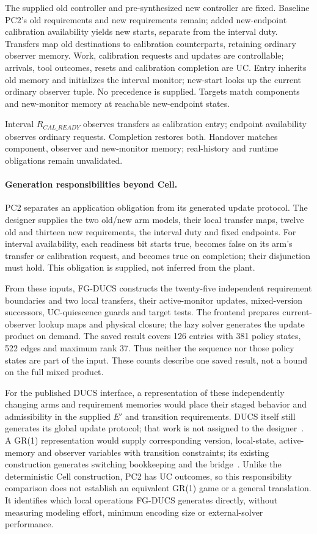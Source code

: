The supplied old controller and pre-synthesized new controller are fixed. Baseline PC2's old requirements and \ContractPCTwoNew{} new requirements remain; added new-endpoint calibration availability yields \PCTwoTraceNewStarts{} new starts, separate from the interval duty. Transfers map old destinations to calibration counterparts, retaining ordinary observer memory. Work, calibration requests and updates are controllable; arrivals, tool outcomes, resets and calibration completion are UC. Entry inherits old memory and initializes the interval monitor; new-start looks up the current ordinary observer tuple. No precedence is supplied. Targets match components and new-monitor memory at reachable new-endpoint states.

Interval $R_{CAL\_READY}$ observes transfers as calibration entry; endpoint availability observes ordinary requests. Completion restores both. Handover matches component, observer and new-monitor memory; real-history and runtime obligations remain unvalidated.


\paragraph{Generation responsibilities beyond Cell.}\label{ta:pc2-generation}
PC2 separates an application obligation from its generated update protocol. The designer supplies the two old/new arm models, their local transfer maps, twelve old and thirteen new requirements, the interval duty and fixed endpoints. For interval availability, each readiness bit starts true, becomes false on its arm's transfer or calibration request, and becomes true on completion; their disjunction must hold. This obligation is supplied, not inferred from the plant.

From these inputs, FG-DUCS constructs the twenty-five independent requirement boundaries and two local transfers, their active-monitor updates, mixed-version successors, UC-quiescence guards and target tests. The frontend prepares current-observer lookup maps and physical closure; the lazy solver generates the update product on demand. The saved result covers 126 entries with 381 policy states, 522 edges and maximum rank 37. Thus neither the sequence nor those policy states are part of the input. These counts describe one saved result, not a bound on the full mixed product.

For the published DUCS interface, a representation of these independently changing arms and requirement memories would place their staged behavior and admissibility in the supplied $E'$ and transition requirements. DUCS itself still generates its global update protocol; that work is not assigned to the designer~\cite[Secs.~4.2, 5]{Nahabedian2020}. A GR(1) representation would supply corresponding version, local-state, active-memory and observer variables with transition constraints; its existing construction generates switching bookkeeping and the bridge~\cite[Def.~3.1, Sec.~4]{Amram2022GR1DynamicUpdate}. Unlike the deterministic Cell construction, PC2 has UC outcomes, so this responsibility comparison does not establish an equivalent GR(1) game or a general translation. It identifies which local operations FG-DUCS generates directly, without measuring modeling effort, minimum encoding size or external-solver performance.
